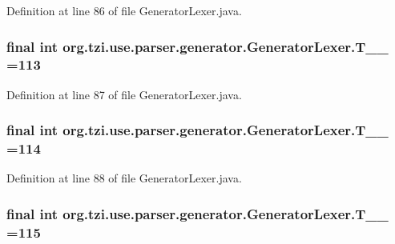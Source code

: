 Definition at line 86 of file Generator\-Lexer.\-java.

\hypertarget{classorg_1_1tzi_1_1use_1_1parser_1_1generator_1_1_generator_lexer_aa378c8ae1c6ae9ca75be32743cfd0166}{
\subsubsection[{T\-\_\-\-\_\-113}]{\setlength{\rightskip}{0pt plus 5cm}final int org.\-tzi.\-use.\-parser.\-generator.\-Generator\-Lexer.\-T\-\_\-\-\_ =113\hspace{0.3cm}{\ttfamily [static]}}}\label{classorg_1_1tzi_1_1use_1_1parser_1_1generator_1_1_generator_lexer_aa378c8ae1c6ae9ca75be32743cfd0166}


Definition at line 87 of file Generator\-Lexer.\-java.

\hypertarget{classorg_1_1tzi_1_1use_1_1parser_1_1generator_1_1_generator_lexer_a884a799a932025442d5e99ad99845e83}{
\subsubsection[{T\-\_\-\-\_\-114}]{\setlength{\rightskip}{0pt plus 5cm}final int org.\-tzi.\-use.\-parser.\-generator.\-Generator\-Lexer.\-T\-\_\-\-\_ =114\hspace{0.3cm}{\ttfamily [static]}}}\label{classorg_1_1tzi_1_1use_1_1parser_1_1generator_1_1_generator_lexer_a884a799a932025442d5e99ad99845e83}


Definition at line 88 of file Generator\-Lexer.\-java.

\hypertarget{classorg_1_1tzi_1_1use_1_1parser_1_1generator_1_1_generator_lexer_aa2fccbffc9a3da2cdc886bb4adf5d6b4}{
\subsubsection[{T\-\_\-\-\_\-115}]{\setlength{\rightskip}{0pt plus 5cm}final int org.\-tzi.\-use.\-parser.\-generator.\-Generator\-Lexer.\-T\-\_\-\-\_ =115\hspace{0.3cm}{\ttfamily [static]}}}\label{classorg_1_1tzi_1_1use_1_1parser_1_1generator_1_1_generator_lexer_aa2fccbffc9a3da2cdc886bb4adf5d6b4}


